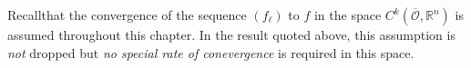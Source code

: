 \begin{remark}\label{chap4-rem5.2}
Recall\pageoriginale that the convergence of the sequence $(f_{\ell})$
to $f$ in the space $C^{k}(\overline{\mathscr{O}}, \mathbb{R}^{n})$ is
assumed throughout this chapter. In the result quoted above, this
assumption is {\em not} dropped but {\em no special rate of conevergence}
is required in this space.
\end{remark}

